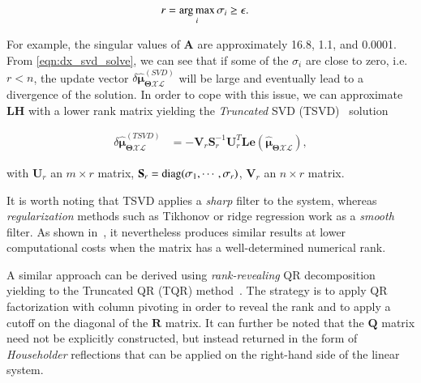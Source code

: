 \begin{equation}\label{eqn:numerical_rank}
  \begin{aligned}
  r &= \operatorname*{arg\,max}_i \sigma_i\geq\epsilon.
  \end{aligned}
\end{equation}

For example, the singular values of $\mathbf{A}$ are approximately 16.8, 1.1,
and 0.0001. From \eqref{eqn:dx_svd_solve}, we can see that if some of the
$\sigma_i$ are close to zero, i.e. $r<n$, the update vector
$\delta\hat{\boldsymbol{\mu}}_{\boldsymbol{\Theta}\mathcal{X}\mathcal{L}}^
{(SVD)}$ will be large and eventually lead to a divergence of the solution. In
order to cope with this issue, we can approximate $\mathbf{L}\mathbf{H}$ with a
lower rank matrix yielding the \emph{Truncated} SVD
(TSVD)~\cite{varah73numerical} solution

\begin{equation}\label{eqn:dx_tsvd_solve}
  \begin{aligned}
  \delta\hat{\boldsymbol{\mu}}_{\boldsymbol{\Theta}\mathcal{X}\mathcal{L}}^
    {(TSVD)} &=
    -\mathbf{V}_r\mathbf{S}_r^{-1}\mathbf{U}_r^T
    \mathbf{L}\mathbf{e}(
    \mathbf{\hat{\boldsymbol{\mu}}_{
    \boldsymbol{\Theta}\mathcal{X}\mathcal{L}}}),
  \end{aligned}
\end{equation}

\noindent with $\mathbf{U}_r$ an $m\times r$ matrix,
$\mathbf{S}_r=\operatorname{diag}(\sigma_1, \cdots,\sigma_r)$, $\mathbf{V}_r$ an $n\times r$
matrix.

It is worth noting that TSVD applies a \emph{sharp} filter to the system,
whereas \emph{regularization} methods such as Tikhonov or ridge regression work
as a \emph{smooth} filter. As shown in~\cite{hansen87truncated}, it nevertheless
produces similar results at lower computational costs when the matrix has a
well-determined numerical rank.

A similar approach can be derived using \emph{rank-revealing} QR
decomposition~\cite{hong92rank} yielding to the Truncated QR (TQR)
method~\cite{kitagawa01regularization}. The strategy is to apply QR
factorization with column pivoting in order to reveal the rank and to apply a
cutoff on the diagonal of the $\mathbf{R}$ matrix. It can further be noted that
the $\mathbf{Q}$ matrix need not be explicitly constructed, but instead returned
in the form of \emph{Householder} reflections that can be applied on the
right-hand side of the linear system.

